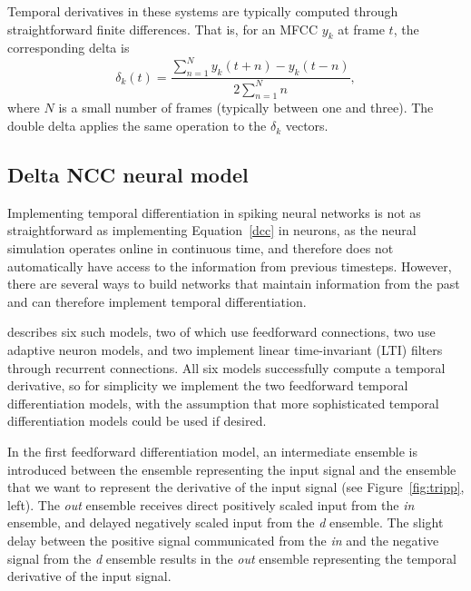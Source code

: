 Temporal derivatives in these systems
are typically computed through straightforward
finite differences.
That is, for an MFCC $y_k$
at frame $t$, the corresponding delta is
\begin{equation}
  \label{dcc}
  \delta_k(t) = \frac{\sum_{n=1}^N y_k(t+n) - y_k(t-n)}{
    2 \sum_{n=1}^N n},
\end{equation}
where $N$ is a small number of frames
(typically between one and three).
The double delta applies the same operation
to the $\delta_k$ vectors.

\subsection{Delta NCC neural model}
\label{sec:impl-deriv}

Implementing temporal differentiation
in spiking neural networks
is not as straightforward as implementing
Equation~\eqref{dcc} in neurons,
as the neural simulation operates
online in continuous time,
and therefore does not automatically
have access to the information
from previous timesteps.
However, there are several ways
to build networks that maintain
information from the past
and can therefore implement temporal differentiation.

\citet{tripp2010} describes six such models,
two of which use feedforward connections,
two use adaptive neuron models,
and two implement linear time-invariant (LTI) filters
through recurrent connections.
All six models successfully
compute a temporal derivative,
so for simplicity we implement
the two feedforward temporal differentiation models,
with the assumption that
more sophisticated temporal differentiation
models could be used if desired.


In the first feedforward differentiation model,
an intermediate ensemble is introduced
between the ensemble representing the input signal
and the ensemble that we want to represent
the derivative of the input signal
(see Figure~\ref{fig:tripp}, left).
The \textit{out} ensemble
receives direct positively scaled input from
the \textit{in} ensemble,
and delayed negatively scaled input from
the \textit{d} ensemble.
The slight delay between the positive signal
communicated from the \textit{in}
and the negative signal
from the \textit{d} ensemble
results in the \textit{out} ensemble
representing the temporal derivative
of the input signal.

